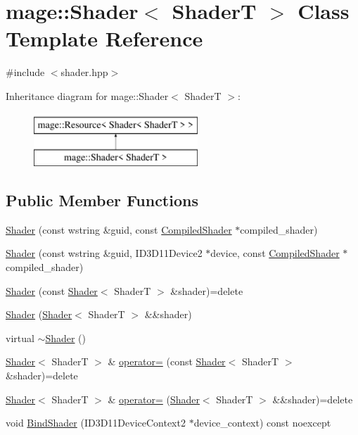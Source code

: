 \hypertarget{classmage_1_1_shader}{}\section{mage\+:\+:Shader$<$ ShaderT $>$ Class Template Reference}
\label{classmage_1_1_shader}


{\ttfamily \#include $<$shader.\+hpp$>$}

Inheritance diagram for mage\+:\+:Shader$<$ ShaderT $>$\+:\begin{figure}[H]
\begin{center}
\leavevmode
\includegraphics[height=2.000000cm]{classmage_1_1_shader}
\end{center}
\end{figure}
\subsection*{Public Member Functions}
\begin{DoxyCompactItemize}
\item 
\hyperlink{classmage_1_1_shader_a00051c5ec2185599d8d4fcce23d42aa8}{Shader} (const wstring \&guid, const \hyperlink{structmage_1_1_compiled_shader}{Compiled\+Shader} $\ast$compiled\+\_\+shader)
\item 
\hyperlink{classmage_1_1_shader_abc59010c784090fb50217ab2012e0407}{Shader} (const wstring \&guid, I\+D3\+D11\+Device2 $\ast$device, const \hyperlink{structmage_1_1_compiled_shader}{Compiled\+Shader} $\ast$compiled\+\_\+shader)
\item 
\hyperlink{classmage_1_1_shader_a343f9b0b670552568a741c96b3595429}{Shader} (const \hyperlink{classmage_1_1_shader}{Shader}$<$ ShaderT $>$ \&shader)=delete
\item 
\hyperlink{classmage_1_1_shader_a15efa0daf4f65792ada9195ef1694766}{Shader} (\hyperlink{classmage_1_1_shader}{Shader}$<$ ShaderT $>$ \&\&shader)
\item 
virtual \hyperlink{classmage_1_1_shader_a0829beb106fdea24cc35832472951cce}{$\sim$\+Shader} ()
\item 
\hyperlink{classmage_1_1_shader}{Shader}$<$ ShaderT $>$ \& \hyperlink{classmage_1_1_shader_ac4a8d4eebb3db5022b5262d516ca68c4}{operator=} (const \hyperlink{classmage_1_1_shader}{Shader}$<$ ShaderT $>$ \&shader)=delete
\item 
\hyperlink{classmage_1_1_shader}{Shader}$<$ ShaderT $>$ \& \hyperlink{classmage_1_1_shader_a37920c4d17e560eb3242574837d12c65}{operator=} (\hyperlink{classmage_1_1_shader}{Shader}$<$ ShaderT $>$ \&\&shader)=delete
\item 
void \hyperlink{classmage_1_1_shader_a357e84054e9df80c2ff88fc09f3199b3}{Bind\+Shader} (I\+D3\+D11\+Device\+Context2 $\ast$device\+\_\+context) const noexcept
\end{DoxyCompactItemize}
